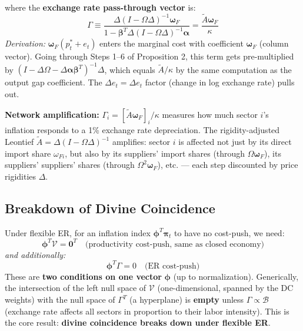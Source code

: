 \documentclass[12pt]{article}
\begin{document}
where the \textbf{exchange rate pass-through vector} is:
\begin{equation}
    \Gamma \equiv \frac{\Delta(I-\Omega\Delta)^{-1}\bm{\omega}_F}{1 - \bm{\beta}^T\Delta(I-\Omega\Delta)^{-1}\bm{\alpha}} = \frac{\tilde{A}\bm{\omega}_F}{\kappa}
\end{equation}
\textit{Derivation:} $\bm{\omega}_F(p_t^*+e_t)$ enters the marginal cost with coefficient $\bm{\omega}_F$ (column vector). Going through Steps 1--6 of Proposition 2, this term gets pre-multiplied by $(I-\Delta\Omega-\Delta\bm{\alpha}\bm{\beta}^T)^{-1}\Delta$, which equals $\tilde{A}/\kappa$ by the same computation as the output gap coefficient. The $\Delta e_t = \Delta e_t$ factor (change in log exchange rate) pulls out.

\begin{insight}
\textbf{Network amplification:} $\Gamma_i = [\tilde{A}\bm{\omega}_F]_i/\kappa$ measures how much sector $i$'s inflation responds to a 1\% exchange rate depreciation. The rigidity-adjusted Leontief $\tilde{A} = \Delta(I-\Omega\Delta)^{-1}$ amplifies: sector $i$ is affected not just by its direct import share $\omega_{Fi}$, but also by its suppliers' import shares (through $\Omega\bm{\omega}_F$), its suppliers' suppliers' shares (through $\Omega^2\bm{\omega}_F$), etc. --- each step discounted by price rigidities $\Delta$.
\end{insight}

\subsection{Breakdown of Divine Coincidence}

Under flexible ER, for an inflation index $\bm{\phi}^T\bm{\pi}_t$ to have no cost-push, we need:
\begin{equation}
    \bm{\phi}^T\mathcal{V} = \mathbf{0}^T \quad \text{(productivity cost-push, same as closed economy)}
\end{equation}
\textit{and additionally:}
\begin{equation}
    \bm{\phi}^T\Gamma = 0 \quad \text{(ER cost-push)}
\end{equation}
These are \textbf{two conditions on one vector} $\bm{\phi}$ (up to normalization). Generically, the intersection of the left null space of $\mathcal{V}$ (one-dimensional, spanned by the DC weights) with the null space of $\Gamma^T$ (a hyperplane) is \textbf{empty} unless $\Gamma \propto \mathcal{B}$ (exchange rate affects all sectors in proportion to their labor intensity). This is the core result: \textbf{divine coincidence breaks down under flexible ER}.
\end{document}
